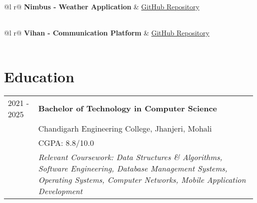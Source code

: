\documentclass[a4paper,12pt]{article}
\begin{document}
\begin{tabularx}{\linewidth}{ @{}l r@{} }
\textbf{Nimbus - Weather Application} & \hfill \href{https://github.com/suraj-yadav0/nimbus}{GitHub Repository} \\[3.75pt]
  \\
\end{tabularx}

\begin{tabularx}{\linewidth}{ @{}l r@{} }
\textbf{Vihan - Communication Platform} & \hfill \href{https://github.com/suraj-yadav0/vihan}{GitHub Repository} \\[3.75pt]
  \\
\end{tabularx}

\section{Education}
\begin{tabularx}{\linewidth}{@{}l X@{}}	
2021 - 2025 & \textbf{Bachelor of Technology in Computer Science} \\
& Chandigarh Engineering College, Jhanjeri, Mohali \\
& CGPA: 8.8/10.0 \\
& \textit{Relevant Coursework: Data Structures \& Algorithms, Software Engineering, Database Management Systems, Operating Systems, Computer Networks, Mobile Application Development} \\
\end{tabularx}

\end{document}
